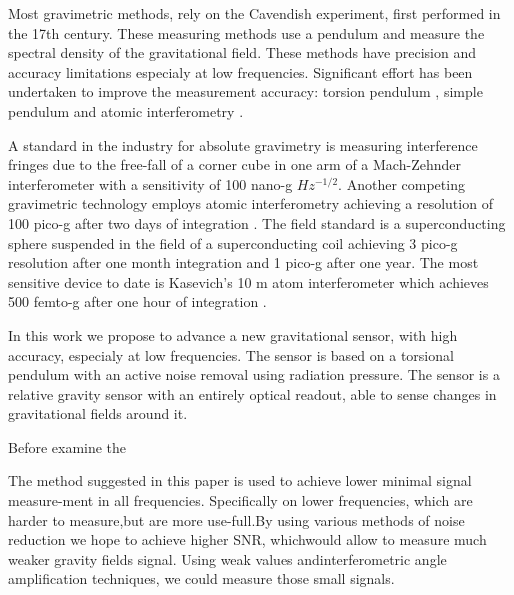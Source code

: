 \documentclass[\main/master.tex]{subfiles}
\begin{document}
\par
Most gravimetric methods, rely on the Cavendish experiment, first performed in the 17th century. These measuring methods use a pendulum and measure the spectral density of the gravitational field. These methods have precision and accuracy limitations especialy at low frequencies. Significant effort has been undertaken to improve the measurement accuracy: torsion pendulum \cite{Luther82,Kuroda95,Karagioz96,Bagley97,Gundlach00,Quinn01,Armstrong03}, simple pendulum \cite {Kleinevoss99,Parks10} and atomic interferometry \cite{Lamporesi08,Sorrentino10,Rosi14}.
\par
A standard in the industry for absolute gravimetry is measuring interference fringes due to the free-fall of a corner cube in one arm of a Mach-Zehnder interferometer with a sensitivity of 100 nano-g $Hz^{-1/2}$. Another competing gravimetric technology employs atomic interferometry achieving a resolution of 100 pico-g after two days of integration \cite{Peters01}. 
The field standard is a superconducting sphere suspended in the field of a superconducting coil achieving 3 pico-g resolution \cite{Goodkind99} after one month integration and 1 pico-g  after one year. 
The most sensitive device to date is Kasevich's 10 m atom interferometer which achieves 500 femto-g after one hour of integration \cite{PhysRevA.91.033629,kasevich2014prospects}. 
\par
In this work we propose to advance a new gravitational sensor, with high accuracy, especialy at low frequencies. The sensor is based on a torsional pendulum with an active noise removal using radiation pressure. The sensor is a relative gravity sensor with an entirely optical readout, able to sense changes in gravitational fields around it. 
\par
Before examine the 





\par The method suggested in this paper is used to achieve lower minimal signal measure-ment in all frequencies. Specifically on lower frequencies, which are harder to measure,but are more use-full.By using various methods of noise reduction we hope to achieve higher SNR, whichwould allow to measure much weaker gravity fields signal. Using weak values andinterferometric angle amplification techniques, we could measure those small signals.
\end{document}
